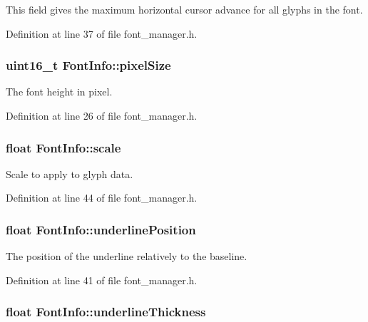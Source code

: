 This field gives the maximum horizontal cursor advance for all glyphs in the font. 



Definition at line 37 of file font\+\_\+manager.\+h.

\hypertarget{struct_font_info_ac105b7c9e6b92868d8629db40d8997f8}{
\subsubsection[{pixel\+Size}]{\setlength{\rightskip}{0pt plus 5cm}uint16\+\_\+t Font\+Info\+::pixel\+Size}}\label{struct_font_info_ac105b7c9e6b92868d8629db40d8997f8}


The font height in pixel. 



Definition at line 26 of file font\+\_\+manager.\+h.

\hypertarget{struct_font_info_ad14ef24faacbdb52fc598ebe1deedfa1}{
\subsubsection[{scale}]{\setlength{\rightskip}{0pt plus 5cm}float Font\+Info\+::scale}}\label{struct_font_info_ad14ef24faacbdb52fc598ebe1deedfa1}


Scale to apply to glyph data. 



Definition at line 44 of file font\+\_\+manager.\+h.

\hypertarget{struct_font_info_a7e89e9a15aca664a36a63e1222838777}{
\subsubsection[{underline\+Position}]{\setlength{\rightskip}{0pt plus 5cm}float Font\+Info\+::underline\+Position}}\label{struct_font_info_a7e89e9a15aca664a36a63e1222838777}


The position of the underline relatively to the baseline. 



Definition at line 41 of file font\+\_\+manager.\+h.

\hypertarget{struct_font_info_a0657ed0e246772231bb768cae16d4f08}{
\subsubsection[{underline\+Thickness}]{\setlength{\rightskip}{0pt plus 5cm}float Font\+Info\+::underline\+Thickness}}\label{struct_font_info_a0657ed0e246772231bb768cae16d4f08}


